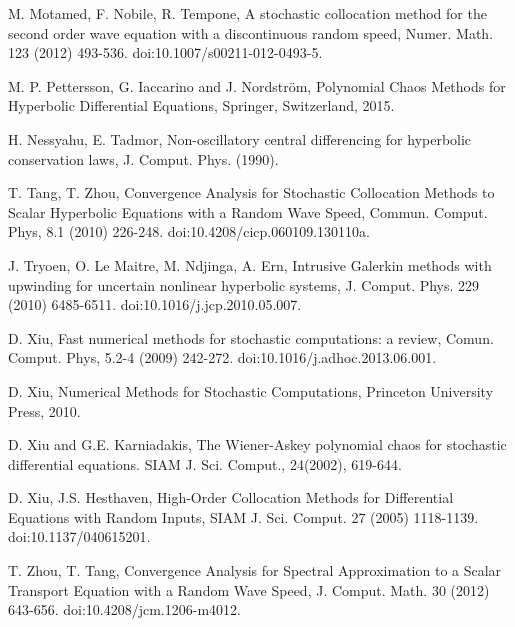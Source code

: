 \documentclass[12pt]{article}
\theoremstyle{plain}
\theoremstyle{remark}
\theoremstyle{remark}
\theoremstyle{remark}
\numberwithin{equation}{section}
\begin{document}
\begin{thebibliography}{00}
 M. Motamed, F. Nobile, R. Tempone, A stochastic collocation method for the second order wave equation with a discontinuous random speed, Numer. Math. 123 (2012) 493-536. doi:10.1007/s00211-012-0493-5.

 M. P. Pettersson, G. Iaccarino and J. Nordstr\"om, Polynomial Chaos Methods for Hyperbolic Differential Equations, Springer, Switzerland, 2015.

 H. Nessyahu, E. Tadmor, Non-oscillatory central differencing for hyperbolic conservation laws, J. Comput. Phys. (1990).

 T. Tang, T. Zhou, Convergence Analysis for Stochastic Collocation Methods to Scalar Hyperbolic Equations with a Random Wave Speed, Commun. Comput. Phys, 8.1 (2010) 226-248. doi:10.4208/cicp.060109.130110a.

 J. Tryoen, O. Le Maitre, M. Ndjinga, A. Ern, Intrusive Galerkin methods with upwinding for uncertain nonlinear hyperbolic systems, J. Comput. Phys. 229 (2010) 6485-6511. doi:10.1016/j.jcp.2010.05.007.

 D. Xiu, Fast numerical methods for stochastic computations: a review, Comun. Comput. Phys, 5.2-4 (2009) 242-272. doi:10.1016/j.adhoc.2013.06.001.

 D. Xiu, Numerical Methods for Stochastic Computations, Princeton University Press, 2010.

 D. Xiu and  G.E. Karniadakis, The Wiener-Askey polynomial chaos for stochastic
differential equations. SIAM J. Sci. Comput., 24(2002), 619-644.

 D. Xiu, J.S. Hesthaven, High-Order Collocation Methods for Differential Equations with Random Inputs, SIAM J. Sci. Comput. 27 (2005) 1118-1139. doi:10.1137/040615201.



 T. Zhou, T. Tang, Convergence Analysis for Spectral Approximation to a Scalar Transport Equation with a Random Wave Speed, J. Comput. Math. 30 (2012) 643-656. doi:10.4208/jcm.1206-m4012.


\end{thebibliography}
\end{document}
